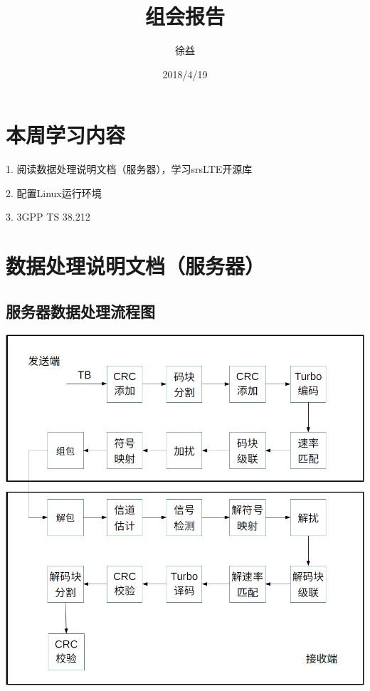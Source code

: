 \documentclass{article}
\title{组会报告}
\author{徐益}
\date{2018/4/19}
\begin{document}
	
\maketitle


\section{本周学习内容}

1. 阅读数据处理说明文档（服务器），学习srsLTE开源库

2. 配置Linux运行环境

3. 3GPP TS 38.212

\section{数据处理说明文档（服务器）}

\subsection{服务器数据处理流程图}
\includegraphics[width = .9\textwidth]{flowchartDataProcess.jpg}
\end{document}
